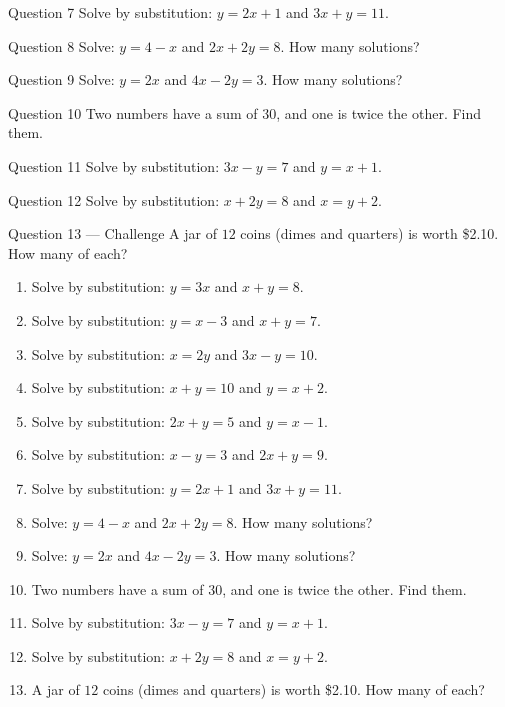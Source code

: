 \documentclass[11pt]{article}
\begin{document}
\begin{qbox}{Question 7}
Solve by substitution: $y=2x+1$ and $3x+y=11$.\workspace{2.4cm}
\end{qbox}

\begin{qbox}{Question 8}
Solve: $y=4-x$ and $2x+2y=8$. How many solutions?\workspace{2.4cm}
\end{qbox}

\begin{qbox}{Question 9}
Solve: $y=2x$ and $4x-2y=3$. How many solutions?\workspace{2.4cm}
\end{qbox}

\begin{qbox}{Question 10}
Two numbers have a sum of $30$, and one is twice the other. Find them.\workspace{2.6cm}
\end{qbox}

\begin{qbox}{Question 11}
Solve by substitution: $3x-y=7$ and $y=x+1$.\workspace{2.4cm}
\end{qbox}

\begin{qbox}{Question 12}
Solve by substitution: $x+2y=8$ and $x=y+2$.\workspace{2.6cm}
\end{qbox}

\begin{qbox}{Question 13 --- Challenge}
A jar of $12$ coins (dimes and quarters) is worth \$2.10. How many of each?\workspace{3.2cm}
\end{qbox}

\clearpage
{}

\begin{recapbox}
\begin{multicols}{2}
\small
\begin{enumerate}[leftmargin=*,itemsep=3pt]
  \item Solve by substitution: $y=3x$ and $x+y=8$.
  \item Solve by substitution: $y=x-3$ and $x+y=7$.
  \item Solve by substitution: $x=2y$ and $3x-y=10$.
  \item Solve by substitution: $x+y=10$ and $y=x+2$.
  \item Solve by substitution: $2x+y=5$ and $y=x-1$.
  \item Solve by substitution: $x-y=3$ and $2x+y=9$.
  \item Solve by substitution: $y=2x+1$ and $3x+y=11$.
  \item Solve: $y=4-x$ and $2x+2y=8$. How many solutions?
  \item Solve: $y=2x$ and $4x-2y=3$. How many solutions?
  \item Two numbers have a sum of $30$, and one is twice the other. Find them.
  \item Solve by substitution: $3x-y=7$ and $y=x+1$.
  \item Solve by substitution: $x+2y=8$ and $x=y+2$.
  \item A jar of $12$ coins (dimes and quarters) is worth \$2.10. How many of each?
\end{enumerate}
\end{multicols}
\end{recapbox}
\end{document}

